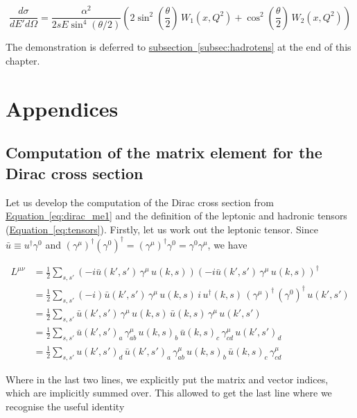 \documentclass[a4paper,10pt]{report}
\newcommand{\eqlabel}{{Equation}}
\newcommand{\subseclabel}{{subsection}}
\newcommand{\equref}[1]{\hyperref[#1]{\eqlabel~\ref*{#1}}}
\newcommand{\subsecref}[1]{\hyperref[#1]{\subseclabel~\ref*{#1}}}
\begin{document}
\begin{equation}
  \frac{d\sigma}{dE'd\Omega} = \frac{\alpha^2}{2sE \sin^4(\theta/2)}\left(2\sin^2\left(\frac{\theta}{2}\right)\,W_1(x, Q^2) + \cos^2\left(\frac{\theta}{2}\right)\,W_2(x,Q^2)\right)
  \label{eq:ps_cswithW}
\end{equation}

The demonstration is deferred to \subsecref{subsec:hadrotens} at the end of this chapter.

\section{Appendices}

\subsection{Computation of the matrix element for the Dirac cross section}
\label{subsec:diraccs}

Let us develop the computation of the Dirac cross section from \equref{eq:dirac_me1} and 
the definition of the leptonic and hadronic tensors (\equref{eq:tensors}). Firstly, let us work 
out the leptonic tensor. Since $\bar{u} \equiv u^\dagger \gamma^0$ and $(\gamma^{\mu})^\dagger (\gamma^0)^\dagger = 
(\gamma^\mu)^\dagger \gamma^0 = \gamma^0 \gamma^\mu$, we have

\begin{align}
  L^{\mu \nu} &= \frac{1}{2}\sum_{s,s'}\left(-i\bar{u}(k',s')\,\gamma^{\mu}\,u(k,s)\right)
  \left(-i\bar{u}(k',s')\,\gamma^{\mu}\,u(k,s)\right)^{\dagger} \nonumber\\ 
  &= \frac{1}{2}\sum_{s,s'}(-i)\bar{u}(k',s')\,\gamma^{\mu}\,u(k,s)\,
  i\,u^\dagger(k,s)\,(\gamma^{\mu})^\dagger\,(\gamma^0)^\dagger\,u(k',s') \nonumber\\ 
  &= \frac{1}{2}\sum_{s,s'}\bar{u}(k',s')\,\gamma^{\mu}\,u(k,s)\,
  \bar{u}(k,s)\,\gamma^{\mu}\,u(k',s') \nonumber \\ 
  &= \frac{1}{2}\sum_{s,s'} \bar{u}(k',s')_a\,\gamma^{\mu}_{ab}\,u(k,s)_b\,
  \bar{u}(k,s)_c\,\gamma^{\mu}_{cd}\,u(k',s')_d \nonumber \\ 
  &= \frac{1}{2}\sum_{s,s'} u(k',s')_d\,\bar{u}(k',s')_a\,\gamma^{\mu}_{ab}\,u(k,s)_b\,
  \bar{u}(k,s)_c\,\gamma^{\mu}_{cd}
\end{align}

Where in the last two lines, we explicitly put the matrix and vector indices, which are implicitly summed over. 
This allowed to get the last line where we recognise the useful identity 
\end{document}
